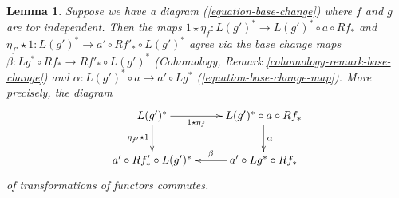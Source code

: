 \documentclass{stacks-project}
\theoremstyle{plain}
\newtheorem{lemma}[subsection]{Lemma}
\theoremstyle{definition}
\theoremstyle{remark}
\numberwithin{equation}{subsection}
\begin{document}
\begin{lemma}
\label{lemma-unit-and-base-change}
Suppose we have a diagram (\ref{equation-base-change}) where $f$ and $g$
are tor independent. Then the maps
$1 \star \eta_f : L(g')^* \to L(g')^* \circ a \circ Rf_*$ and
$\eta_{f'} \star 1 : L(g')^* \to a' \circ Rf'_* \circ L(g')^*$
agree via the base change maps
$\beta : Lg^* \circ Rf_* \to Rf'_* \circ L(g')^*$
(Cohomology, Remark \ref{cohomology-remark-base-change})
and $\alpha : L(g')^* \circ a \to a' \circ Lg^*$
(\ref{equation-base-change-map}).
More precisely, the diagram
$$
\xymatrix{
L(g')^* \ar[r]_-{1 \star \eta_f} \ar[d]_{\eta_{f'} \star 1} &
L(g')^* \circ a \circ Rf_* \ar[d]^\alpha \\
a' \circ Rf'_* \circ L(g')^* &
a' \circ Lg^* \circ Rf_* \ar[l]_-\beta
}
$$
of transformations of functors commutes.
\end{lemma}
\end{document}
